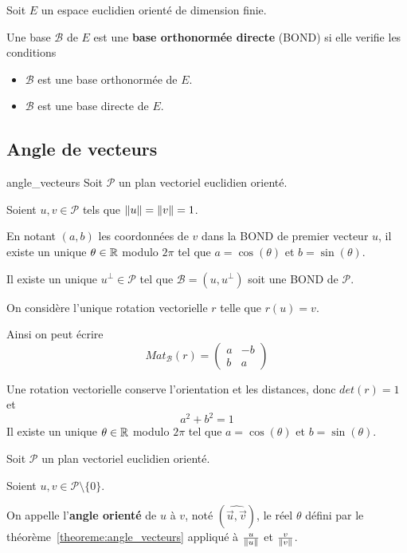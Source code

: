 \documentclass[a4paper,12pt]{article}
\begin{document}
\begin{definition}
    Soit $E$ un espace euclidien orienté de dimension finie.

    Une base $\mathcal{B}$ de $E$ est une \textbf{base orthonormée directe} (BOND) si elle verifie les conditions
    \begin{itemize}
        \item $\mathcal{B}$ est une base orthonormée de $E$.
        \item $\mathcal{B}$ est une base directe de $E$.
    \end{itemize}
\end{definition}

\subsection{Angle de vecteurs}

\begin{theoreme}{}{angle_vecteurs}
    Soit $\mathcal{P}$ un plan vectoriel euclidien orienté.

    Soient $u, v \in \mathcal{P}$ tels que $\left\lVert u\right\rVert = \left\lVert v\right\rVert = 1$.

    \vspace{1cm}
    En notant $(a, b)$ les coordonnées de $v$ dans la BOND de premier vecteur $u$,
    il existe un unique $\theta \in \mathbb{R}$ modulo $2\pi$ tel que $a = \cos(\theta)$ et $b = \sin(\theta)$.
\end{theoreme}

\begin{demonstration}
    Il existe un unique $u^\perp \in \mathcal{P}$ tel que $\mathcal{B} = (u, u^\perp)$ soit une BOND de $\mathcal{P}$.

    On considère l'unique rotation vectorielle $r$ telle que $r(u) = v$.

    Ainsi on peut écrire
    $$
    Mat_{\mathcal{B}}(r) = \begin{pmatrix}
        a & -b \\
        b & a
    \end{pmatrix}
    $$

    Une rotation vectorielle conserve l'orientation et les distances, donc $det(r) = 1$ et
    $$
    a^2 + b^2 = 1
    $$
    Il existe un unique $\theta \in \mathbb{R}$ modulo $2\pi$ tel que $a = \cos(\theta)$ et $b = \sin(\theta)$.
\end{demonstration}

\begin{definition}
    Soit $\mathcal{P}$ un plan vectoriel euclidien orienté.

    Soient $u, v \in \mathcal{P}\setminus\{0\}$.

    On appelle l'\textbf{angle orienté} de $u$ à $v$, noté $(\widehat{\overrightarrow{u}, \overrightarrow{v}})$,
    le réel $\theta$ défini par le théorème~\ref{theoreme:angle_vecteurs} appliqué à $\frac{u}{\left\lVert u\right\rVert}$ et $\frac{v}{\left\lVert v\right\rVert}$.
\end{definition}
\end{document}
